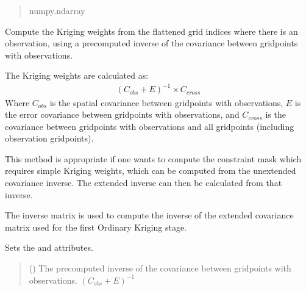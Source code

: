 \documentclass[letterpaper,10pt,english]{sphinxmanual}
\begin{document}
\begin{fulllineitems}
\begin{fulllineitems}
\begin{quote}
\begin{description}
\sphinxAtStartPar
numpy.ndarray

\end{description}\end{quote}

\end{fulllineitems}


\begin{fulllineitems}
\label{\detokenize{kriging:glomar_gridding.stochastic.StochasticKriging.kriging_weights_from_inverse}}
\pysigstartsignatures
\pysiglinewithargsret
{}
{}
{}
\pysigstopsignatures
\sphinxAtStartPar
Compute the Kriging weights from the flattened grid indices where
there is an observation, using a pre\sphinxhyphen{}computed inverse of the covariance
between grid\sphinxhyphen{}points with observations.

\sphinxAtStartPar
The Kriging weights are calculated as:
\begin{equation*}
\begin{split}(C_{obs} + E)^{-1} \times C_{cross}\end{split}
\end{equation*}
\sphinxAtStartPar
Where \(C_{obs}\) is the spatial covariance between grid\sphinxhyphen{}points
with observations, \(E\) is the error covariance between grid\sphinxhyphen{}points
with observations, and \(C_{cross}\) is the covariance between
grid\sphinxhyphen{}points with observations and all grid\sphinxhyphen{}points (including observation
grid\sphinxhyphen{}points).

\sphinxAtStartPar
This method is appropriate if one wants to compute the constraint mask
which requires simple Kriging weights, which can be computed from the
unextended covariance inverse. The extended inverse can then be
calculated from that inverse.

\sphinxAtStartPar
The inverse matrix is used to compute the inverse of the extended
covariance matrix used for the first Ordinary Kriging stage.

\sphinxAtStartPar
Sets the  and  attributes.
\begin{quote}\begin{description}
\sphinxAtStartPar
{} () \textendash{} The pre\sphinxhyphen{}computed inverse of the covariance between grid\sphinxhyphen{}points with
observations. \((C_{obs} + E)^{-1}\)


\end{description}
\end{quote}
\end{fulllineitems}
\end{fulllineitems}
\end{document}

